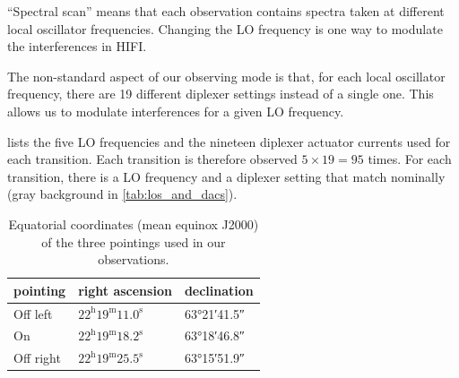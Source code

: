 ``Spectral scan'' means that each observation contains spectra taken at different local oscillator frequencies.
Changing the LO frequency is one way to modulate the interferences in HIFI.

The non-standard aspect of our observing mode is that, for each local oscillator frequency, there are 19 different diplexer settings instead of a single one.
This allows us to modulate interferences for a given LO frequency.

 lists the five LO frequencies and the nineteen diplexer actuator currents used for each transition.
Each transition is therefore observed $5 \times 19 = 95$ times.
For each transition, there is a LO frequency and a diplexer setting that match nominally (gray background in \cref{tab:los_and_dacs}).

\begin{table}[b]
%
    \centering
    \begin{tabular}{lll}
        \toprule
        pointing  & right ascension & declination \\
        \midrule
        Off left  & $22^\text{h}19^\text{m}11.0^\text{s}$ & \ang{63;21;41.5}\\
        On        & $22^\text{h}19^\text{m}18.2^\text{s}$ & \ang{63;18;46.8}\\
        Off right & $22^\text{h}19^\text{m}25.5^\text{s}$ & \ang{63;15;51.9}\\
        \bottomrule
    \end{tabular}
    \caption{Equatorial coordinates (mean equinox J2000) of the three pointings used in our observations.}
    \label{tab:on_off_positions}
\end{table}

